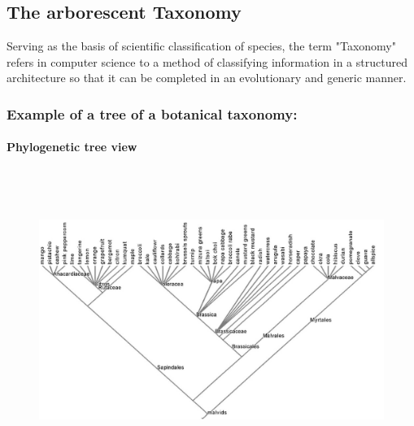 \documentclass[12pt]{report}
\begin{document}
\vspace{\baselineskip}

\vspace{\baselineskip}

\vspace{\baselineskip}



\newpage

\vspace{\baselineskip}\subsection*{The arborescent Taxonomy }

\vspace{\baselineskip}
Serving as the basis of scientific classification of species, the term "Taxonomy" refers in computer science to a method of classifying information in a structured architecture so that it can be completed in an evolutionary and generic manner.\par

\subsubsection*{Example of a tree of a botanical taxonomy:}

\vspace{\baselineskip}
\paragraph*{Phylogenetic tree view}
\par

\begin{figure}[H]
	\begin{center}		\includegraphics[height=3.82in]{./media/image3.jpeg}
	\end{center}\end{figure}
\end{document}
